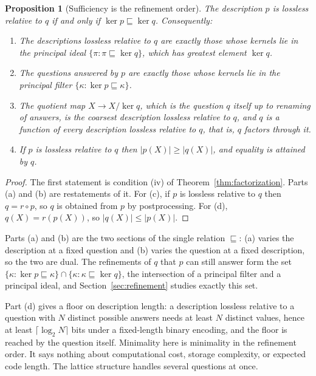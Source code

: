 \documentclass[11pt]{article}
\newtheorem{proposition}[theorem]{Proposition}
\theoremstyle{definition}
\theoremstyle{remark}
\newcommand{\refines}{\sqsubseteq}
\begin{document}
\begin{proposition}[Sufficiency is the refinement order]\label{prop:order}
The description $p$ is lossless relative to $q$ if and only if $\ker p\refines\ker q$. Consequently:
\begin{enumerate}
\item[\textup{(a)}] The descriptions lossless relative to $q$ are exactly those whose kernels lie in the principal ideal $\{\pi:\pi\refines\ker q\}$, which has greatest element $\ker q$.
\item[\textup{(b)}] The questions answered by $p$ are exactly those whose kernels lie in the principal filter $\{\kappa:\ker p\refines\kappa\}$.
\item[\textup{(c)}] The quotient map $X\to X/\ker q$, which is the question $q$ itself up to renaming of answers, is the coarsest description lossless relative to $q$, and $q$ is a function of every description lossless relative to $q$, that is, $q$ factors through it.
\item[\textup{(d)}] If $p$ is lossless relative to $q$ then $|p(X)|\ge|q(X)|$, and equality is attained by $q$.
\end{enumerate}
\end{proposition}

\begin{proof}
The first statement is condition (iv) of Theorem~\ref{thm:factorization}. Parts (a) and (b) are restatements of it. For (c), if $p$ is lossless relative to $q$ then $q=r\circ p$, so $q$ is obtained from $p$ by postprocessing. For (d), $q(X)=r(p(X))$, so $|q(X)|\le|p(X)|$.
\end{proof}

Parts (a) and (b) are the two sections of the single relation $\refines$: (a) varies the description at a fixed question and (b) varies the question at a fixed description, so the two are dual. The refinements of $q$ that $p$ can still answer form the set $\{\kappa:\ker p\refines\kappa\}\cap\{\kappa:\kappa\refines\ker q\}$, the intersection of a principal filter and a principal ideal, and Section~\ref{sec:refinement} studies exactly this set.

Part (d) gives a floor on description length: a description lossless relative to a question with $N$ distinct possible answers needs at least $N$ distinct values, hence at least $\lceil\log_2 N\rceil$ bits under a fixed-length binary encoding, and the floor is reached by the question itself. Minimality here is minimality in the refinement order. It says nothing about computational cost, storage complexity, or expected code length. The lattice structure handles several questions at once.
\end{document}
